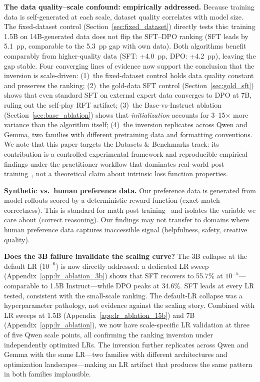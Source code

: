 \documentclass{article}
\begin{document}
\textbf{The data quality--scale confound: empirically addressed.}
Because training data is self-generated at each scale, dataset quality correlates with model size. The fixed-dataset control (Section~\ref{sec:fixed_dataset}) directly tests this: training 1.5B on 14B-generated data does not flip the SFT--DPO ranking (SFT leads by 5.1~pp, comparable to the 5.3~pp gap with own data). Both algorithms benefit comparably from higher-quality data (SFT: +4.0~pp, DPO: +4.2~pp), leaving the gap stable. Four converging lines of evidence now support the conclusion that the inversion is scale-driven: (1)~the fixed-dataset control holds data quality constant and preserves the ranking; (2)~the gold-data SFT control (Section~\ref{sec:gold_sft}) shows that even standard SFT on external expert data converges to DPO at 7B, ruling out the self-play RFT artifact; (3)~the Base-vs-Instruct ablation (Section~\ref{sec:base_ablation}) shows that \emph{initialization} accounts for 3--15$\times$ more variance than the algorithm itself; (4)~the inversion replicates across Qwen and Gemma, two families with different pretraining data and formatting conventions. We note that this paper targets the Datasets \& Benchmarks track: its contribution is a controlled experimental framework and reproducible empirical findings under the practitioner workflow that dominates real-world post-training~\citep{shao2024deepseekmath, deepseek2025r1}, not a theoretical claim about intrinsic loss function properties.

\textbf{Synthetic vs.\ human preference data.}
Our preference data is generated from model rollouts scored by a deterministic reward function (exact-match correctness). This is standard for math post-training~\citep{shao2024deepseekmath, deepseek2025r1} and isolates the variable we care about (correct reasoning). Our findings may not transfer to domains where human preference data captures inaccessible signal (helpfulness, safety, creative quality).

\textbf{Does the 3B failure invalidate the scaling curve?}
The 3B collapse at the default LR ($10^{-6}$) is now directly addressed: a dedicated LR sweep (Appendix~\ref{app:lr_ablation_3b}) shows that SFT recovers to 55.7\% at $10^{-5}$---comparable to 1.5B Instruct---while DPO peaks at 34.6\%. SFT leads at every LR tested, consistent with the small-scale ranking. The default-LR collapse was a hyperparameter pathology, not evidence against the scaling story. Combined with LR sweeps at 1.5B (Appendix~\ref{app:lr_ablation_15b}) and 7B (Appendix~\ref{app:lr_ablation}), we now have scale-specific LR validation at three of five Qwen scale points, all confirming the ranking inversion under independently optimized LRs. The inversion further replicates across Qwen and Gemma with the same LR---two families with different architectures and optimization landscapes---making an LR artifact that produces the same pattern in both families implausible.
\end{document}
